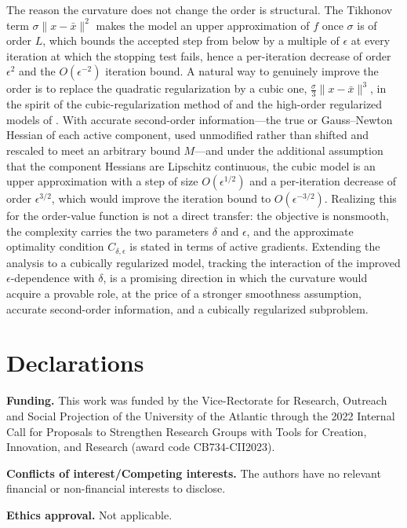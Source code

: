\documentclass[11pt]{article}
\begin{document}
The reason the curvature does not change the order is structural. The Tikhonov
term $\sigma\|x - \bar x\|^2$ makes the model an upper approximation of $f$ once
$\sigma$ is of order $L$, which bounds the accepted step from below by a
multiple of $\epsilon$ at every iteration at which the stopping test fails,
hence a per-iteration decrease of order $\epsilon^2$ and the $O(\epsilon^{-2})$
iteration bound. A natural way to
genuinely improve the order is to replace the quadratic regularization by a
cubic one, $\tfrac{\sigma}{3}\|x - \bar x\|^3$, in the spirit of the
cubic-regularization method of \cite{nesterov} and the high-order regularized
models of \cite{bgmst1, bgms}. With accurate second-order information---the true
or Gauss--Newton Hessian of each active component, used unmodified rather than
shifted and rescaled to meet an arbitrary bound $M$---and under the additional
assumption that the component Hessians are
Lipschitz continuous, the cubic model is an upper approximation with a step of
size $O(\epsilon^{1/2})$ and a per-iteration decrease of order $\epsilon^{3/2}$,
which would improve the iteration bound to $O(\epsilon^{-3/2})$. Realizing this
for the order-value function is not a direct transfer: the objective is
nonsmooth, the complexity carries the two parameters $\delta$ and $\epsilon$, and
the approximate optimality condition $C_{\delta,\epsilon}$ is stated in terms of
active gradients. Extending the analysis to a cubically regularized model,
tracking the interaction of the improved $\epsilon$-dependence with $\delta$, is
a promising direction in which the curvature would acquire a provable role, at
the price of a stronger smoothness assumption, accurate second-order information,
and a cubically regularized subproblem.

\section*{Declarations}

\medskip
\noindent
\textbf{Funding.} This work was funded by the Vice-Rectorate for Research, Outreach and Social Projection of the University of the Atlantic through the 2022 Internal Call for Proposals to Strengthen Research Groups with Tools for Creation, Innovation, and Research (award code CB734-CII2023).

\medskip
\noindent
\textbf{Conflicts of interest/Competing interests.} The authors have no relevant financial or non-financial interests to disclose.

\medskip
\noindent
\textbf{Ethics approval.} Not applicable.
\end{document}
